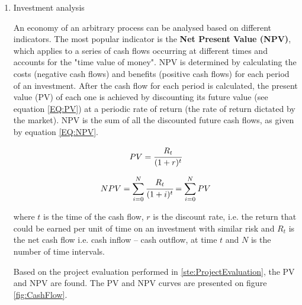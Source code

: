 \begin{enumerate}[label=\textbf{Step \arabic{enumi}}:,ref=Step \arabic{enumi}]
	\item Investment analysis 
	
	An economy of an arbitrary process can be analysed based on different indicators. The most popular indicator is the \textbf{Net Present Value (NPV)}, which applies to a series of cash flows occurring at different times and accounts for the "time value of money". NPV is determined by calculating the costs (negative cash flows) and benefits (positive cash flows) for each period of an investment. After the cash flow for each period is calculated, the present value (PV) of each one is achieved by discounting its future value (see equation \ref{EQ:PV}) at a periodic rate of return (the rate of return dictated by the market). NPV is the sum of all the discounted future cash flows, as given by equation \ref{EQ:NPV}.
	
	\begin{equation}
		PV = \cfrac{R_t}{(1+r)^t}
		\label{EQ:PV}
	\end{equation}

	\begin{equation}
		NPV = \sum_{i=0}^{N} \cfrac{R_{t}}{(1+i)^t} = \sum_{i=0}^{N} PV
		\label{EQ:NPV}
	\end{equation}

	where $t$ is the time of the cash flow, $r$ is the discount rate, i.e. the return that could be earned per unit of time on an investment with similar risk and $R_{t}$ is the net cash flow i.e. cash inflow – cash outflow, at time $t$ and $N$ is the number of time intervals.
	
	Based on the project evaluation performed in \ref{ste:ProjectEvaluation}, the PV and NPV are found. The PV and NPV curves are presented on figure \ref{fig:CashFlow}.
	
	\begin{figure}[h!]
		\centering
\end{figure}
\end{enumerate}
